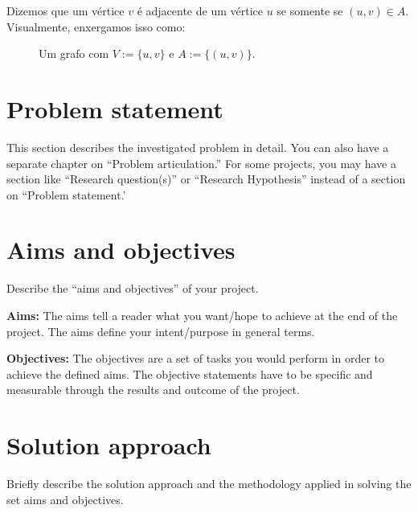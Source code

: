 \begin{mydef}[Adjacência]
  Dizemos que um vértice $v$ é adjacente de um vértice $u$ se somente
  se $(u,v) \in A$. Visualmente, enxergamos isso como:
  \begin{figure}[h]
    \centering
    \caption{Um grafo com $V := \{u,v\}$ e $A :=
    \{(u,v)\}.$}
  \end{figure}
\end{mydef}


\section{Problem statement}
\label{sec:intro_prob_art}
This section describes the investigated problem in detail. You can
also have a separate chapter on ``Problem articulation.''  For some
projects, you may have a section like ``Research question(s)'' or
``Research Hypothesis'' instead of a section on ``Problem statement.'

\section{Aims and objectives}
\label{sec:intro_aims_obj}
Describe the ``aims and objectives'' of your project.

\textbf{Aims:} The aims tell a reader what you want/hope to achieve
at the end of the project. The  aims define your intent/purpose in
general terms.

\textbf{Objectives:} The objectives are a set of tasks you would
perform in order to achieve the defined aims. The objective
statements have to be specific and measurable through the results and
outcome of the project.

\section{Solution approach}
\label{sec:intro_sol} %
Briefly describe the solution approach and the methodology applied in
solving the set aims and objectives.

